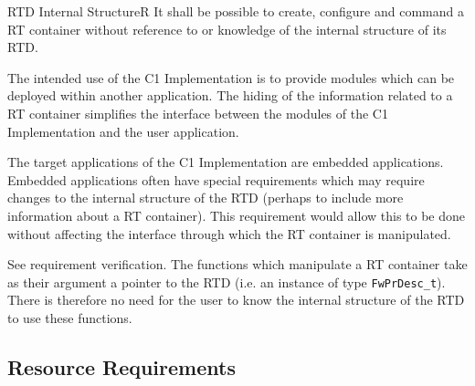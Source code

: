 \documentclass[a4paper,10pt]{article}
\newenvironment{fw_req}[6]
{\addtocounter{subsubsection}{1}
	\hspace{0.2cm}\textbf{FW-\arabic{section}.\arabic{subsection}.\arabic{subsubsection}/#2
	\hspace{0.8cm} #1}
	\vspace{-10pt}
\begin{longtable}{p{2.7cm}P{8.5cm}}
\hline
\textsc{Requirement} & #3 \\
\textsc{Justification} & #4 \\
\textsc{Implementation} & #5  \\ 
\textsc{Verification} & #6  \\
\hline
}
{\end{longtable}}
\begin{document}
\begin{fw_req}{RTD Internal Structure}{R}
{It shall be possible to create, configure and command a RT container without reference to or knowledge of the internal structure of its RTD.}
{The intended use of the C1 Implementation is to provide modules which can be deployed within another application. The hiding of the information related to a RT container simplifies the interface between the modules of the C1 Implementation and the user application.

The target applications of the C1 Implementation are embedded applications. Embedded applications often have special requirements which may require changes to the internal
structure of the RTD (perhaps to include more information about a RT container). This requirement would allow this to be done without affecting the interface through which 
the RT container is manipulated.} 
{See requirement verification.} 
{The functions which manipulate a RT container take as their argument a pointer to the RTD (i.e. an instance of type \texttt{FwPrDesc\_t}). There is therefore no need for the user to know the internal structure of the RTD to use these functions.}
\end{fw_req}


\subsection{Resource Requirements}\label{req:resourceReqs}
\end{document}
